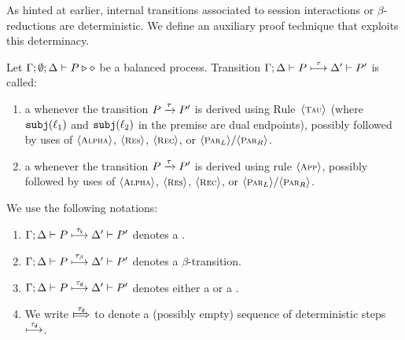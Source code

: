 As hinted at earlier, internal transitions associated to session interactions or  
$\beta$-reductions are deterministic.  We define an auxiliary proof technique that exploits this determinacy.
		
\begin{definition}
\label{def:dettrans}
	Let  $\Gamma; \emptyset; \Delta \vdash P \triangleright \diamond$ be a balanced \HOp process. 
	Transition $\Gamma; \Delta \vdash P \stackrel{\tau}{\longmapsto} \Delta' \vdash P'$ is called:
%
	\begin{enumerate}[$-$]
		\item 
				a {\em \sesstran} whenever the   transition $P \xrightarrow{\tau} P'$ 
				is derived using Rule~${\langle \text{\footnotesize \textsc{Tau}} \rangle}$ 
				(where $\mathtt{subj}(\ell_1)$ and $\mathtt{subj}(\ell_2)$ in the premise are dual endpoints), 
				possibly followed by uses of  ${\langle \text{\footnotesize \textsc{Alpha}} \rangle}$, ${\langle \text{\footnotesize \textsc{Res}} \rangle}$, ${\langle \text{\footnotesize \textsc{Rec}} \rangle}$, or ${\langle \text{\footnotesize \textsc{Par${}_L$}} \rangle}/
				{\langle \text{\footnotesize \textsc{Par${}_R$}} \rangle}$.

		
		\item
				a {\em \betatran} whenever the transition $P \xrightarrow{\tau} P'$
				is derived using rule ${\langle \text{\footnotesize \textsc{App}} \rangle}$,
				possibly followed by uses of  ${\langle \text{\footnotesize \textsc{Alpha}} \rangle}$, ${\langle \text{\footnotesize \textsc{Res}} \rangle}$, ${\langle \text{\footnotesize \textsc{Rec}} \rangle}$, or ${\langle \text{\footnotesize \textsc{Par${}_L$}} \rangle}/
				{\langle \text{\footnotesize \textsc{Par${}_R$}} \rangle}$.


	\end{enumerate}
%
\end{definition}

\begin{notation} We use the following notations:
	\begin{enumerate}[$-$]
		\item 	 $\Gamma; \Delta \vdash P \stackrel{\tau_{\mathsf{s}}}{\longmapsto} \Delta' \vdash P'$  denotes a \sesstran.
		
		\item  $\Gamma; \Delta \vdash P \stackrel{\tau_{\beta}}{\longmapsto} \Delta' \vdash P'$   denotes a $\beta$-transition.

		\item	 $\Gamma; \Delta \vdash P \stackrel{\tau_{\mathsf{d}}}{\longmapsto} \Delta' \vdash P'$   denotes
				either a \sesstran or a \betatran.
\item  We write $\Hby{\dtau}$ to denote a (possibly empty) sequence of deterministic steps $\stackrel{\tau_{\mathsf{d}}}{\longmapsto}$.
	\end{enumerate}
\end{notation}


